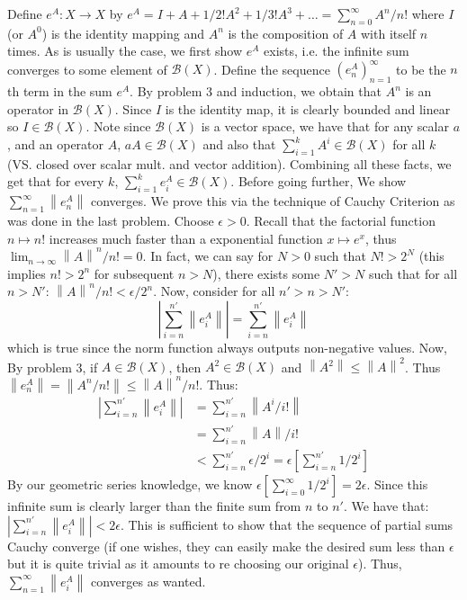 \documentclass{article}
\newcommand{\norm}[1]{\left\lVert#1\right\rVert}
\begin{document}
    Define $e^A: X\to X$ by $e^A = I + A + 1/2!A^2 + 1/3!A^3 + \hdots = \sum_{n=0}^{\infty} A^n/n!$ where $I$ (or $A^0$) is the identity 
    mapping and $A^n$ is the composition
    of $A$ with itself $n$ times. As is usually the case, we first show $e^A$ exists, i.e. the infinite sum converges to some element 
    of $\mathcal{B}(X)$. Define the sequence $(e^A_n)_{n=1}^{\infty}$ to be the $n$th term in the sum $e^A$. By problem 3 and induction,
    we obtain that $A^n$ is an operator in $\mathcal{B}(X)$. Since $I$ is the identity map, it is clearly bounded and linear so
    $I\in\mathcal{B}(X)$. Note since $\mathcal{B}(X)$ is a vector space, we have that for any scalar $a$, and an
    operator $A$, $aA\in\mathcal{B}(X)$ and also that $\sum_{i=1}^k A^i\in\mathcal{B}(X)$ for all $k$ (VS. closed over scalar mult. and 
    vector addition). Combining all these facts, we get that for every $k$, $\sum_{i=1}^k e^A_i\in\mathcal{B}(X)$. Before going
    further, We show $\sum_{n=1}^{\infty} \norm{e^A_n}$ converges. We prove this via the technique of Cauchy Criterion as was
    done in the last problem. Choose $\epsilon>0$. Recall that the factorial function $n\mapsto n!$ increases much faster than
    a exponential function $x\mapsto e^x$, thus $\lim_{n\to\infty} \norm{A}^n/n! = 0$. In fact, we can say for $N>0$ such that
    $N!>2^N$ (this implies $n!>2^n$ for subsequent $n>N$), there exists some $N'>N$ such that for all 
    $n>N'$: $\norm{A}^n/n! < \epsilon/2^n$. Now, consider for all $n'>n>N'$:
    \begin{equation}
        |\sum_{i=n}^{n'} \norm{e^A_i}| = \sum_{i=n}^{n'} \norm{e^A_i}
    \end{equation}
    which is true since the norm function always outputs non-negative values. Now,
    By problem 3, if $A\in\mathcal{B}(X)$, then $A^2\in\mathcal{B}(X)$ and $\norm{A^2} \leq \norm{A}^2$. Thus $\norm{e^A_n}
    = \norm{A^n/n!} \leq \norm{A}^n/n!$. Thus:
    \begin{align*}
        |\sum_{i=n}^{n'} \norm{e^A_i}| &= \sum_{i=n}^{n'} \norm{A^i/i!} \\
            &= \sum_{i=n}^{n'} \norm{A}/i! \\
            &< \sum_{i=n}^{n'} \epsilon/2^i = \epsilon[\sum_{i=n}^{n'} 1/2^i]
    \end{align*}
    By our geometric series knowledge, we know $\epsilon[\sum_{i=0}^{\infty} 1/2^i] = 2\epsilon$. Since this infinite sum is clearly
    larger than the finite sum from $n$ to $n'$. We have that: $|\sum_{i=n}^{n'} \norm{e^A_i}| < 2\epsilon$. This is sufficient to
    show that the sequence of partial sums Cauchy converge (if one wishes, they can easily make the desired sum less than $\epsilon$
    but it is quite trivial as it amounts to re choosing our original $\epsilon$). Thus, $\sum_{n=1}^{\infty} \norm{e^A_i}$ converges
    as wanted.\\
\end{document}

